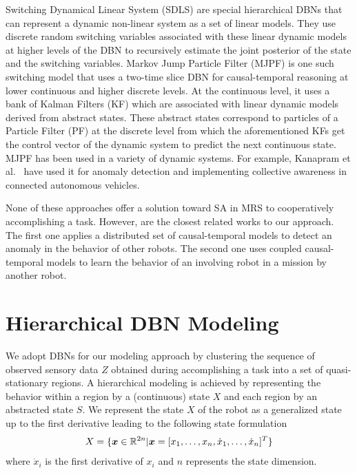 \documentclass[runningheads]{llncs}
\begin{document}
Switching Dynamical Linear System (SDLS) \cite{sudderth-2009-nonparametric-bayesian-learning-of-switching-linear-dynamical-systems} are special hierarchical DBNs that can represent a dynamic non-linear system as a set of linear models. They use discrete random switching variables associated with these linear dynamic models at higher levels of the DBN to recursively estimate the joint posterior of the state and the switching variables.   
Markov Jump Particle Filter (MJPF) \cite{baydoun-2018-learning-switching-models-for-abnormality-detection-for-autonomous-driving}  is one such switching model that uses a two-time slice DBN \cite{koller-2001-sampling-in-factored-dynamic-systems} for causal-temporal reasoning at lower continuous and higher discrete levels. At the continuous level, it uses a bank of Kalman Filters (KF) which are associated with linear dynamic models derived from abstract states. These abstract states correspond to particles of a Particle Filter (PF) at the discrete level from which the aforementioned KFs get the control vector of the dynamic system to predict the next continuous state. MJPF has been used in a variety of dynamic systems. For example, Kanapram et al.~\cite{kanapram-2021-dynamic-bayesian-collective-awareness-models-for-a-network-of-ego-things} have used it for anomaly detection and implementing collective awareness in connected autonomous vehicles. 

None of these approaches offer a solution toward SA in MRS to cooperatively accomplishing a task. However, \cite{kanapram-2021-dynamic-bayesian-collective-awareness-models-for-a-network-of-ego-things,baydoun-2019-prediction-of-multi-target-dynamics-using-discrete-descriptors-an-interactive-approach} are the closest related works to our approach. The first one applies a distributed set of causal-temporal models to detect an anomaly in the behavior of other robots. The second one uses coupled causal-temporal models to learn the behavior of an involving robot in a mission by another robot.   

\section{Hierarchical DBN Modeling}
\label{sec-single-dbn}
We adopt DBNs for our modeling approach by clustering the sequence of observed sensory data $Z$ obtained during accomplishing a task into a set of quasi-stationary regions. A hierarchical modeling is achieved by representing the behavior within a region by a (continuous) state $X$ and each region by an abstracted state $S$. We represent the state $X$ of the robot as a generalized state up to the first derivative leading to the following state formulation
    \begin{equation}
        \small
        X = \{\bm{x} \in \mathbb{R}^{2n} | \bm{x}=[x_1,\dots,x_n,\dot{x}_1,\dots,\dot{x}_n]^T \}
        \label{eq-state-space-morphology}
    \end{equation} 
    where $\dot{x}_i$ is the first derivative of $x_i$ and $n$ represents the state dimension. 
    
\end{document}
